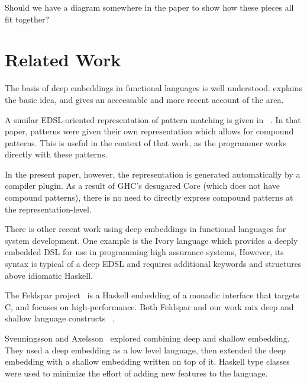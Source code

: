 \documentclass[runningheads, a4paper]{llncs}
\newcommand{\showtodos}{}  %
\newenvironment{todo}
  {\ifthenelse{\isundefined{\showtodos}}{\comment}{\begin{tcolorbox}
    \textbf{TODO}:}}
  {\ifthenelse{\isundefined{\showtodos}}{\endcomment}{\end{tcolorbox}}
  }
\begin{document}
\begin{todo}
Should we have a diagram somewhere in the paper to show how these pieces all fit together?
\end{todo}

\section{Related Work}


The basis of deep embeddings in functional languages is well understood.
\cite{Elliott:03:CompileDSEL-JFP} explains the basic idea, and \cite{Gill:2014:DSLSynth}
gives an acceessable and more recent account of the area.

A similar EDSL-oriented representation of pattern matching is given in
~\cite[Section~3.3]{Atkey:09:Unembedding}. In that paper, patterns were given their own
representation which allows for compound patterns. This is useful in the context
of that work, as the programmer works directly with these patterns.

In the present paper, however, the representation is generated automatically by
a compiler plugin. As a result of GHC's desugared Core (which does not have
compound patterns), there is no need to directly express compound patterns at
the representation-level.

There is other recent work using deep embeddings in functional languages for 
system development.  One example is the Ivory language \cite{Elliott2015-Ivory} 
which provides a deeply embedded DSL for use in programming high assurance
systems,  However, its syntax is typical of a deep EDSL and requires additional
keywords and structures above idiomatic Haskell. 

The Feldspar project~\cite{Axelsson:10:Feldspar,Svenningsson:13:Combining}
is a Haskell embedding of a monadic interface
that targets C, and focuses on high-performance.  Both Feldspar and our work
mix deep and shallow language constructs ~\cite{Persson:11:MonadicDSL,Svenningsson:13:Compositional,Sculthorpe:13:ConstrainedMonad}.

Svenningsson and Axelsson~\cite{Svenningsson:13:Combining}
explored combining deep and shallow embedding.  They used
a deep embedding as a low level language, then extended
the deep embedding with a shallow embedding written on top
of it. Haskell type classes were used to minimize the effort of adding
new features to the language.
\end{document}
